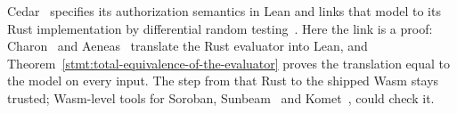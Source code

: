 Cedar~\cite{cedar} specifies its authorization semantics in Lean and links that
model to its Rust implementation by differential random
testing~\cite{cedar-vgd}. Here the link is a proof: Charon~\cite{charon} and
Aeneas~\cite{aeneas} translate the Rust evaluator into Lean, and
Theorem~\ref{stmt:total-equivalence-of-the-evaluator} proves the translation
equal to the model on every input. The step from that Rust to the shipped Wasm
stays trusted; Wasm-level tools for Soroban, Sunbeam~\cite{sunbeam} and
Komet~\cite{komet}, could check it.
